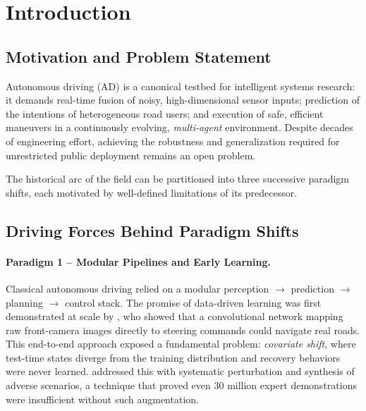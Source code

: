\documentclass[12pt, a4paper]{article}
\begin{document}
\newpage
\tableofcontents
\newpage

\section{Introduction}
\label{sec:intro}

\subsection{Motivation and Problem Statement}

Autonomous driving (AD) is a canonical testbed for intelligent systems research: it
demands real-time fusion of noisy, high-dimensional sensor inputs; prediction of the
intentions of heterogeneous road users; and execution of safe, efficient maneuvers
in a continuously evolving, \emph{multi-agent} environment. Despite decades of
engineering effort, achieving the robustness and generalization required for
unrestricted public deployment remains an open problem.

The historical arc of the field can be partitioned into three successive paradigm
shifts, each motivated by well-defined limitations of its predecessor.

\subsection{Driving Forces Behind Paradigm Shifts}

\paragraph{Paradigm 1 -- Modular Pipelines and Early Learning.}
Classical autonomous driving relied on a modular perception $\to$ prediction
$\to$ planning $\to$ control stack. The promise of data-driven learning was first
demonstrated at scale by \citet{bojarski2016end}, who showed that a convolutional
network mapping raw front-camera images directly to steering commands could
navigate real roads. This end-to-end approach exposed a fundamental problem:
\emph{covariate shift}, where test-time states diverge from the training distribution
and recovery behaviors were never learned. \citet{bansal2018chauffeur} addressed
this with systematic perturbation and synthesis of adverse scenarios, a technique
that proved even 30 million expert demonstrations were insufficient without such
augmentation.
\end{document}
